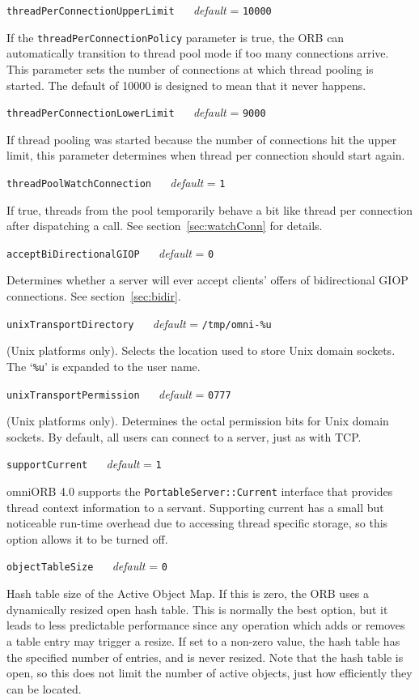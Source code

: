 \documentclass[11pt,twoside,a4paper]{book}
\makeatletter
\newcommand{\type}[1]{\texttt{#1}}
\newcommand{\code}[1]{\texttt{#1}}
\newcommand{\confopt}[2]
  {\vspace{\baselineskip}\par\noindent\code{#1} ~~ \textit{default} =
   \code{#2}\\[-1ex]\@afterheading}
\makeatother
\begin{document}
\confopt{threadPerConnectionUpperLimit}{10000}

If the \code{threadPerConnectionPolicy} parameter is true, the ORB can
automatically transition to thread pool mode if too many connections
arrive. This parameter sets the number of connections at which thread
pooling is started. The default of 10000 is designed to mean that it
never happens.


\confopt{threadPerConnectionLowerLimit}{9000}

If thread pooling was started because the number of connections hit
the upper limit, this parameter determines when thread per connection
should start again.


\confopt{threadPoolWatchConnection}{1}

If true, threads from the pool temporarily behave a bit like thread
per connection after dispatching a call. See
section~\ref{sec:watchConn} for details.


\confopt{acceptBiDirectionalGIOP}{0}

Determines whether a server will ever accept clients' offers of
bidirectional GIOP connections. See section~\ref{sec:bidir}.


\confopt{unixTransportDirectory}{/tmp/omni-\%u}

(Unix platforms only). Selects the location used to store Unix domain
sockets. The `\code{\%u}' is expanded to the user name.


\confopt{unixTransportPermission}{0777}

(Unix platforms only). Determines the octal permission bits for Unix
domain sockets. By default, all users can connect to a server, just as
with TCP.


\confopt{supportCurrent}{1}

omniORB 4.0 supports the \type{PortableServer::Current} interface that
provides thread context information to a servant. Supporting current
has a small but noticeable run-time overhead due to accessing thread
specific storage, so this option allows it to be turned off.


\confopt{objectTableSize}{0}

Hash table size of the Active Object Map. If this is zero, the ORB
uses a dynamically resized open hash table. This is normally the best
option, but it leads to less predictable performance since any
operation which adds or removes a table entry may trigger a resize. If
set to a non-zero value, the hash table has the specified number of
entries, and is never resized. Note that the hash table is open, so
this does not limit the number of active objects, just how efficiently
they can be located.
\end{document}
